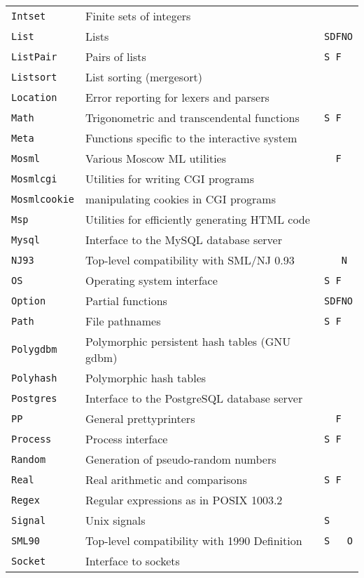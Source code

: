\documentclass[fleqn,a4paper]{article}
\begin{document}
\begin{center}
\begin{tabular}{@{}|lll|}
{\tt Intset} & Finite sets of integers & \\
{\tt List}   & Lists & {\tt SDFNO}\\
{\tt ListPair} & Pairs of lists & {\tt S F}\\
{\tt Listsort} & List sorting (mergesort) & \\
{\tt Location} & Error reporting for lexers and parsers & \\
{\tt Math}   & Trigonometric and transcendental functions & {\tt S F}\\
{\tt Meta}   & Functions specific to the interactive system &\\
{\tt Mosml}  & Various Moscow ML utilities & {\tt \ \ F}\\
{\tt Mosmlcgi}  & Utilities for writing CGI programs & \\
{\tt Mosmlcookie}  & manipulating cookies in CGI programs & \\
{\tt Msp}    & Utilities for efficiently generating HTML code & \\
{\tt Mysql}  & Interface to the MySQL database server & \\
{\tt NJ93}   & Top-level compatibility with SML/NJ 0.93 & {\tt \ \ \ N}\\
{\tt OS}     & Operating system interface & {\tt S F}\\
{\tt Option} & Partial functions & {\tt SDFNO}\\
{\tt Path}   & File pathnames & {\tt S F}\\
{\tt Polygdbm} & Polymorphic persistent hash tables (GNU gdbm) & \\
{\tt Polyhash} & Polymorphic hash tables & \\
{\tt Postgres} & Interface to the PostgreSQL database server & \\
{\tt PP}     & General prettyprinters & {\tt \ \ F}\\
{\tt Process} & Process interface & {\tt S F}\\
{\tt Random} & Generation of pseudo-random numbers & \\
{\tt Real}   & Real arithmetic and comparisons & {\tt S F}\\
{\tt Regex}  & Regular expressions as in POSIX 1003.2 & \\
{\tt Signal}   & Unix signals & {\tt S}\\
{\tt SML90}    & Top-level compatibility with 1990 Definition & {\tt S\
  \ \ O}\\
{\tt Socket} & Interface to sockets & \\

\end{tabular}
\end{center}
\end{document}
